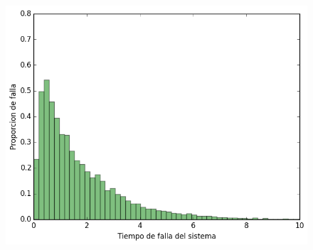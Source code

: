 \documentclass[10pt,a4paper]{article} %
\begin{document}
                                                                                                                                                                                                                                                                                                                                                                                                                                \begin {figure}[!htb]
                                                                                                                                                                                                                                                                                                                                                                                                                                    \centering
                                                                                                                                                                                                                                                                                                                                                                                                                                        \includegraphics[width=12cm] {img/1op2rep}
                                                                                                                                                                                                                                                                                                                                                                                                                                            \end {figure}
                                                                                                                                                                                                                                                                                                                                                                                                                                                
\end{document}
